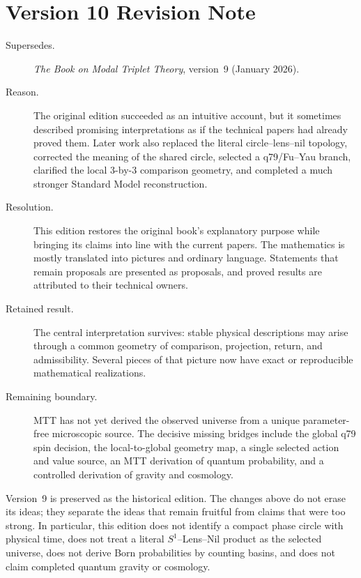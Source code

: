 \documentclass[11pt,openany]{book}
\begin{document}
\chapter*{Version 10 Revision Note}

\begin{description}
\item[Supersedes.] \emph{The Book on Modal Triplet Theory}, version~9
(January 2026).

\item[Reason.] The original edition succeeded as an intuitive account, but it
sometimes described promising interpretations as if the technical papers had
already proved them. Later work also replaced the literal
circle--lens--nil topology, corrected the meaning of the shared circle,
selected a q79/Fu--Yau branch, clarified the local $3$-by-$3$ comparison
geometry, and completed a much stronger Standard Model reconstruction.

\item[Resolution.] This edition restores the original book's explanatory
purpose while bringing its claims into line with the current papers. The
mathematics is mostly translated into pictures and ordinary language.
Statements that remain proposals are presented as proposals, and proved
results are attributed to their technical owners.

\item[Retained result.] The central interpretation survives: stable physical
descriptions may arise through a common geometry of comparison, projection,
return, and admissibility. Several pieces of that picture now have exact or
reproducible mathematical realizations.

\item[Remaining boundary.] MTT has not yet derived the observed universe from
a unique parameter-free microscopic source. The decisive missing bridges
include the global q79 spin decision, the local-to-global geometry map, a
single selected action and value source, an MTT derivation of quantum
probability, and a controlled derivation of gravity and cosmology.
\end{description}

Version~9 is preserved as the historical edition. The changes above do not
erase its ideas; they separate the ideas that remain fruitful from claims
that were too strong. In particular, this edition does not identify a compact
phase circle with physical time, does not treat a literal
$S^1$--Lens--Nil product as the selected universe, does not derive Born
probabilities by counting basins, and does not claim completed quantum
gravity or cosmology.
\end{document}

